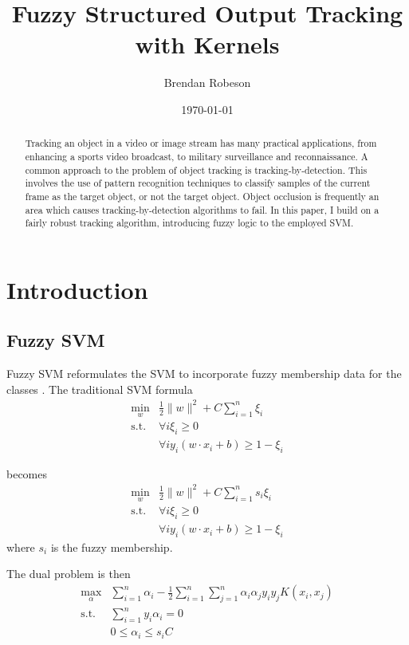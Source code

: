 \documentclass{IEEEtran}
\begin{document}
\title{Fuzzy Structured Output Tracking with Kernels}
\author{Brendan Robeson}
\date{\today}
\maketitle

\begin{abstract}
    Tracking an object in a video or image stream has many practical applications, from enhancing a
    sports video broadcast, to military surveillance and reconnaissance. A common approach to the
    problem of object tracking is tracking-by-detection. This involves the use of pattern
    recognition techniques to classify samples of the current frame as the target object, or not the
    target object. Object occlusion is frequently an area which causes tracking-by-detection
    algorithms to fail. In this paper, I build on a fairly robust tracking algorithm, introducing
    fuzzy logic to the employed SVM.
\end{abstract}

\section{Introduction}
\subsection{Fuzzy SVM} %
Fuzzy SVM reformulates the SVM to incorporate fuzzy membership data for the classes \cite{}. The
traditional SVM formula
\begin{align}
    \min_w & \frac{1}{2}\|w\|^2 + C\sum_{i=1}^n\xi_i \\
    \text{s.t. } & \forall i \xi_i \ge 0 \nonumber \\
                 & \forall i y_i \left(w \cdot x_i + b\right) \ge 1 - \xi_i \nonumber
\end{align}

becomes
\begin{align}
    \min_w & \frac{1}{2}\|w\|^2 + C\sum_{i=1}^ns_i\xi_i \\
    \text{s.t. } & \forall i \xi_i \ge 0 \nonumber \\
                 & \forall i y_i \left(w \cdot x_i + b\right) \ge 1 - \xi_i \nonumber
\end{align}
where \(s_i\) is the fuzzy membership.

The dual problem is then
\begin{align}
    \max_\alpha & \sum_{i=1}^n \alpha_i - \frac{1}{2} \sum_{i=1}^n \sum_{j=1}^n \alpha_i \alpha_j y_i y_j K\left(x_i, x_j\right) \\
    \text{s.t. } & \sum_{i=1}^n y_i \alpha_i = 0 \nonumber \\
                 & 0 \le \alpha_i \le s_iC \nonumber
\end{align}
\end{document}
